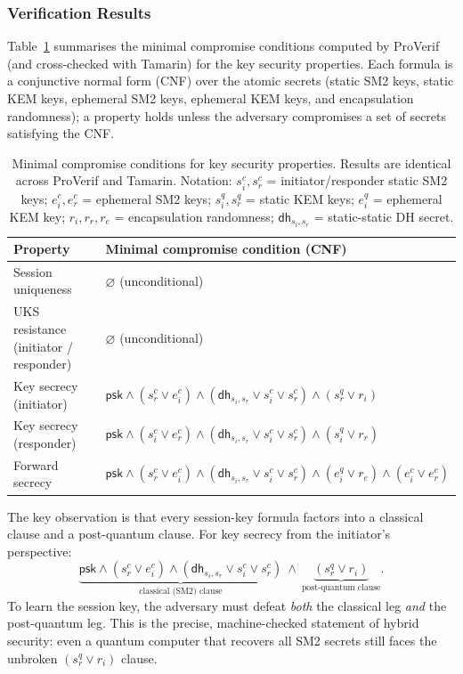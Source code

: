 \documentclass{SCIS2026}
\begin{document}
\subsubsection{Verification Results}
\label{sec:veriresults}

Table~\ref{tab:cnf} summarises the minimal compromise conditions
computed by ProVerif (and cross-checked with Tamarin) for the key
security properties.  Each formula is a conjunctive normal form (CNF)
over the atomic secrets (static SM2 keys, static KEM keys, ephemeral
SM2 keys, ephemeral KEM keys, and encapsulation randomness); a
property holds unless the adversary compromises a set of secrets
satisfying the CNF.

\begin{table}[htbp]
\centering
\caption{Minimal compromise conditions for key security properties.
Results are identical across ProVerif and Tamarin.  Notation:
$s^c_i, s^c_r$ = initiator/responder static SM2 keys;
$e^c_i, e^c_r$ = ephemeral SM2 keys;
$s^q_i, s^q_r$ = static KEM keys;
$e^q_i$ = ephemeral KEM key;
$r_i, r_r, r_e$ = encapsulation randomness;
$\mathsf{dh}_{s_i,s_r}$ = static-static DH secret.}
\label{tab:cnf}
\footnotesize
\tabcolsep 5pt
\begin{tabular}{ll}
\toprule
\textbf{Property} & \textbf{Minimal compromise condition (CNF)} \\
\midrule
Session uniqueness & $\varnothing$ (unconditional) \\
UKS resistance (initiator / responder) & $\varnothing$ (unconditional) \\[2pt]
Key secrecy (initiator)
  & $\mathsf{psk}\land(s^c_r\lor e^c_i)\land(\mathsf{dh}_{s_i,s_r}\lor s^c_i\lor s^c_r)\land(s^q_r\lor r_i)$ \\[2pt]
Key secrecy (responder)
  & $\mathsf{psk}\land(s^c_i\lor e^c_r)\land(\mathsf{dh}_{s_i,s_r}\lor s^c_i\lor s^c_r)\land(s^q_i\lor r_r)$ \\[2pt]
Forward secrecy
  & $\mathsf{psk}\land(s^c_r\lor e^c_i)\land(\mathsf{dh}_{s_i,s_r}\lor s^c_i\lor s^c_r)\land(e^q_i\lor r_e)\land(e^c_i\lor e^c_r)$ \\
\bottomrule
\end{tabular}
\end{table}

The key observation is that every session-key formula factors into a
classical clause and a post-quantum clause.  For key secrecy from the
initiator's perspective:
\[
\underbrace{\mathsf{psk}\land(s^c_r\lor e^c_i)\land(\mathsf{dh}_{s_i,s_r}\lor s^c_i\lor s^c_r)}_{\text{classical (SM2) clause}}
\ \land\
\underbrace{(s^q_r\lor r_i)}_{\text{post-quantum clause}}.
\]
To learn the session key, the adversary must defeat \emph{both} the
classical leg \emph{and} the post-quantum leg.  This is the precise,
machine-checked statement of hybrid security: even a quantum computer
that recovers all SM2 secrets still faces the unbroken
$(s^q_r\lor r_i)$ clause.
\end{document}
